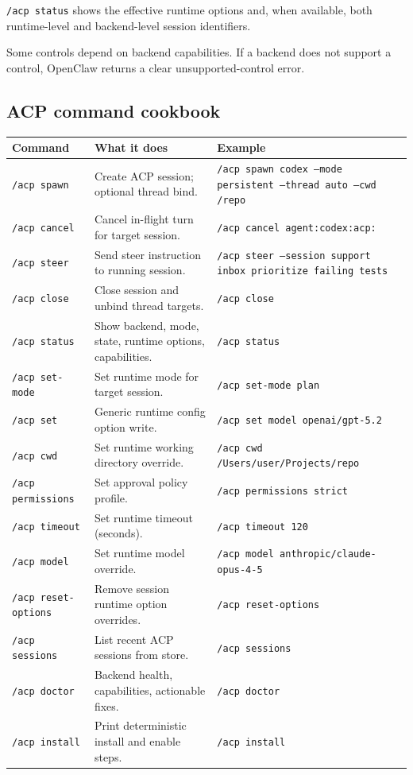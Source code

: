 \texttt{/acp status} shows the effective runtime options and, when available, both runtime-level and backend-level session identifiers.

Some controls depend on backend capabilities. If a backend does not support a control, OpenClaw returns a clear unsupported-control error.

\subsection{ACP command cookbook}



\begin{table}[h]
\centering
\small
\begin{tabular}{|l|l|l|}
\hline
Command & What it does & Example \\
\hline
\texttt{/acp spawn} & Create ACP session; optional thread bind. & \texttt{/acp spawn codex --mode persistent --thread auto --cwd /repo} \\
\hline
\texttt{/acp cancel} & Cancel in-flight turn for target session. & \texttt{/acp cancel agent:codex:acp:} \\
\hline
\texttt{/acp steer} & Send steer instruction to running session. & \texttt{/acp steer --session support inbox prioritize failing tests} \\
\hline
\texttt{/acp close} & Close session and unbind thread targets. & \texttt{/acp close} \\
\hline
\texttt{/acp status} & Show backend, mode, state, runtime options, capabilities. & \texttt{/acp status} \\
\hline
\texttt{/acp set-mode} & Set runtime mode for target session. & \texttt{/acp set-mode plan} \\
\hline
\texttt{/acp set} & Generic runtime config option write. & \texttt{/acp set model openai/gpt-5.2} \\
\hline
\texttt{/acp cwd} & Set runtime working directory override. & \texttt{/acp cwd /Users/user/Projects/repo} \\
\hline
\texttt{/acp permissions} & Set approval policy profile. & \texttt{/acp permissions strict} \\
\hline
\texttt{/acp timeout} & Set runtime timeout (seconds). & \texttt{/acp timeout 120} \\
\hline
\texttt{/acp model} & Set runtime model override. & \texttt{/acp model anthropic/claude-opus-4-5} \\
\hline
\texttt{/acp reset-options} & Remove session runtime option overrides. & \texttt{/acp reset-options} \\
\hline
\texttt{/acp sessions} & List recent ACP sessions from store. & \texttt{/acp sessions} \\
\hline
\texttt{/acp doctor} & Backend health, capabilities, actionable fixes. & \texttt{/acp doctor} \\
\hline
\texttt{/acp install} & Print deterministic install and enable steps. & \texttt{/acp install} \\
\hline
\end{tabular}
\end{table}



